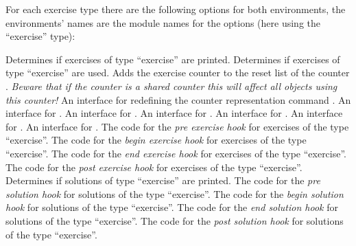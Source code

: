 \documentclass{xsim-manual}
\begin{document}
For each exercise type there are the following options for both environments,
the environments' names are the module names for the options (here using the
\enquote{exercise} type):
\begin{options}
    Determines if exercises of type \enquote{exercise} are printed.
    Determines if exercises of type \enquote{exercise} are used.
  \Default
    Adds the exercise counter to the reset list of the counter
    .  \emph{Beware that if the counter is a shared counter
      this will affect \emph{all objects} using this counter!}
    An interface for redefining the counter representation command
    .
    An interface for %
    .
    An interface for %
    .
    An interface for %
    .
    An interface for %
    .
    An interface for %
    .
    An interface for %
    .
  \Default
    The code for the \emph{pre exercise hook} for exercises of the type
    \enquote{exercise}.
  \Default
    The code for the \emph{begin exercise hook} for exercises of the type
    \enquote{exercise}.
  \Default
    The code for the \emph{end exercise hook} for exercises of the type
    \enquote{exercise}.
  \Default
    The code for the \emph{post exercise hook} for exercises of the type
    \enquote{exercise}.
    Determines if solutions of type \enquote{exercise} are printed.
  \Default
    The code for the \emph{pre solution hook} for solutions of the type
    \enquote{exercise}.
  \Default
    The code for the \emph{begin solution hook} for solutions of the type
    \enquote{exercise}.
  \Default
    The code for the \emph{end solution hook} for solutions of the type
    \enquote{exercise}.
  \Default
    The code for the \emph{post solution hook} for solutions of the type
    \enquote{exercise}.
\end{options}
\end{document}
